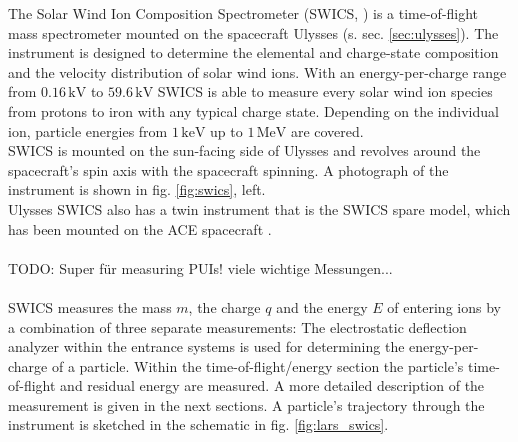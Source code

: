 The Solar Wind Ion Composition Spectrometer (SWICS, \citet{gloeckler_1992}) is a time-of-flight mass spectrometer mounted on the spacecraft Ulysses (s. sec. \ref{sec:ulysses}). The instrument is designed to determine the elemental and charge-state composition and the velocity distribution of solar wind ions. With an energy-per-charge range from $0.16 \, \mathrm{kV}$ to $59.6 \, \mathrm{kV}$ SWICS is able to measure every solar wind ion species from protons to iron with any typical charge state. Depending on the individual ion, particle energies from $1 \,\mathrm{keV}$ up to $1 \, \mathrm{MeV}$ are covered.\\
SWICS is mounted on the sun-facing side of Ulysses and revolves around the spacecraft's spin axis with the spacecraft spinning. A photograph of the instrument is shown in fig. \ref{fig:swics}, left.\\
Ulysses SWICS also has a twin instrument that is the SWICS spare model, which has been mounted on the ACE spacecraft \citep{stone_ace}.
\\ \\ 
TODO: Super für measuring PUIs! viele wichtige Messungen... \\ \\
%
%
%
SWICS measures the mass $m$, the charge $q$ and the energy $E$ of entering ions by a combination of three separate measurements: The electrostatic deflection analyzer within the entrance systems is used for determining the energy-per-charge of a particle. Within the time-of-flight/energy section the particle's time-of-flight and residual energy are measured. A more detailed description of the measurement is given in the next sections. A particle's trajectory through the instrument is sketched in the schematic in fig. \ref{fig:lars_swics}.
%
